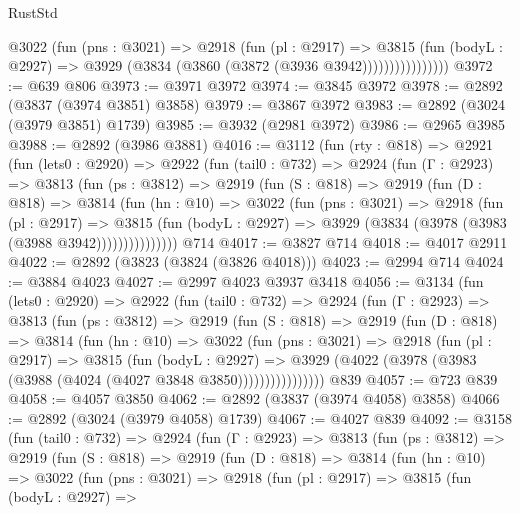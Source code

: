 \begin{lexlean}{RustStd}
\begin{coremodule}
                    @3022
                      (fun (pns : @3021) =>
                      @2918
                        (fun (pl : @2917) =>
                        @3815
                          (fun (bodyL : @2927) =>
                          @3929 (@3834 (@3860 (@3872 (@3936 @3942))))))))))))))))
@3972 := @639 @806
@3973 := @3971 @3972
@3974 := @3845 @3972
@3978 := @2892 (@3837 (@3974 @3851) @3858)
@3979 := @3867 @3972
@3983 := @2892 (@3024 (@3979 @3851) @1739)
@3985 := @3932 (@2981 @3972)
@3986 := @2965 @3985
@3988 := @2892 (@3986 @3881)
@4016 := @3112
    (fun (rty : @818) =>
    @2921
      (fun (lets0 : @2920) =>
      @2922
        (fun (tail0 : @732) =>
        @2924
          (fun (Γ : @2923) =>
          @3813
            (fun (ps : @3812) =>
            @2919
              (fun (S : @818) =>
              @2919
                (fun (D : @818) =>
                @3814
                  (fun (hn : @10) =>
                  @3022
                    (fun (pns : @3021) =>
                    @2918
                      (fun (pl : @2917) =>
                      @3815
                        (fun (bodyL : @2927) =>
                        @3929 (@3834 (@3978 (@3983 (@3988 @3942)))))))))))))))
    @714
@4017 := @3827 @714
@4018 := @4017 @2911
@4022 := @2892 (@3823 (@3824 (@3826 @4018)))
@4023 := @2994 @714
@4024 := @3884 @4023
@4027 := @2997 @4023 @3937 @3418
@4056 := @3134
    (fun (lets0 : @2920) =>
    @2922
      (fun (tail0 : @732) =>
      @2924
        (fun (Γ : @2923) =>
        @3813
          (fun (ps : @3812) =>
          @2919
            (fun (S : @818) =>
            @2919
              (fun (D : @818) =>
              @3814
                (fun (hn : @10) =>
                @3022
                  (fun (pns : @3021) =>
                  @2918
                    (fun (pl : @2917) =>
                    @3815
                      (fun (bodyL : @2927) =>
                      @3929 (@4022 (@3978 (@3983 (@3988 (@4024 (@4027 @3848 @3850))))))))))))))))
    @839
@4057 := @723 @839
@4058 := @4057 @3850
@4062 := @2892 (@3837 (@3974 @4058) @3858)
@4066 := @2892 (@3024 (@3979 @4058) @1739)
@4067 := @4027 @839
@4092 := @3158
    (fun (tail0 : @732) =>
    @2924
      (fun (Γ : @2923) =>
      @3813
        (fun (ps : @3812) =>
        @2919
          (fun (S : @818) =>
          @2919
            (fun (D : @818) =>
            @3814
              (fun (hn : @10) =>
              @3022
                (fun (pns : @3021) =>
                @2918
                  (fun (pl : @2917) =>
                  @3815
                    (fun (bodyL : @2927) =>

\end{coremodule}
\end{lexlean}
